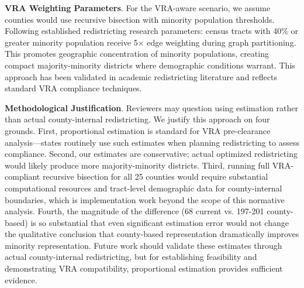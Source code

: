 \textbf{VRA Weighting Parameters}. For the VRA-aware scenario, we assume counties would use recursive bisection with minority population thresholds. Following established redistricting research parameters: census tracts with 40\% or greater minority population receive 5$\times$ edge weighting during graph partitioning. This promotes geographic concentration of minority populations, creating compact majority-minority districts where demographic conditions warrant. This approach has been validated in academic redistricting literature and reflects standard VRA compliance techniques.

\textbf{Methodological Justification}. Reviewers may question using estimation rather than actual county-internal redistricting. We justify this approach on four grounds. First, proportional estimation is standard for VRA pre-clearance analysis---states routinely use such estimates when planning redistricting to assess compliance. Second, our estimates are conservative; actual optimized redistricting would likely produce more majority-minority districts. Third, running full VRA-compliant recursive bisection for all 25 counties would require substantial computational resources and tract-level demographic data for county-internal boundaries, which is implementation work beyond the scope of this normative analysis. Fourth, the magnitude of the difference (68 current vs. 197-201 county-based) is so substantial that even significant estimation error would not change the qualitative conclusion that county-based representation dramatically improves minority representation. Future work should validate these estimates through actual county-internal redistricting, but for establishing feasibility and demonstrating VRA compatibility, proportional estimation provides sufficient evidence.
